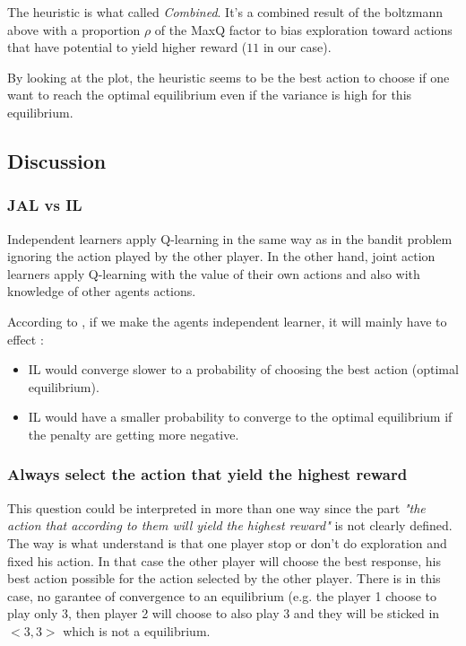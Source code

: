 \documentclass[11pt]{article}
\begin{document}
The heuristic is what \cite{bestref} called \textit{Combined}. It's a combined result of the boltzmann above with a proportion $\rho$ of the MaxQ factor to bias exploration toward actions that have potential to yield higher reward ($11$ in our case).

By looking at the plot, the heuristic seems to be the best action to choose if one want to reach the optimal equilibrium even if the variance is high for this equilibrium.


\subsection{Discussion}

\subsubsection{JAL vs IL}


Independent learners apply Q-learning in the same way as in the bandit problem ignoring the action played by the other player. In the other hand, joint action learners apply Q-learning with the value of their own actions and also with knowledge of other agents actions.

According to \cite{bestref}, if we make the agents independent learner, it will mainly have to effect :
\begin{itemize}
	\item IL would converge slower to a probability of choosing the best action (optimal equilibrium).
	\item IL would have a smaller probability to converge to the optimal equilibrium if the penalty are getting more negative.
\end{itemize}

\subsubsection{Always select the action that yield the highest reward}

This question could be interpreted in more than one way since the part \textit{"the action that according to them will yield the highest reward"} is not clearly defined. The way is what understand is that one player stop or don't do exploration and fixed his action. In that case the other player will choose the best response, his best action possible for the action selected by the other player. There is in this case, no garantee of convergence to an equilibrium (e.g. the player 1 choose to play only $3$, then player 2 will choose to also play $3$ and they will be sticked in $<3,3>$ which is not a equilibrium.


\printbibliography
\end{document}

